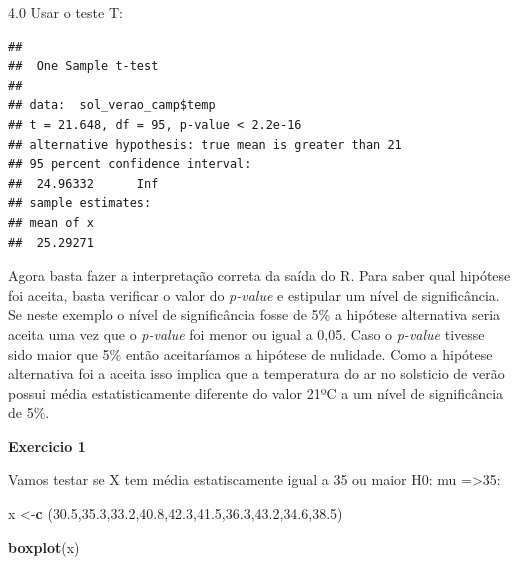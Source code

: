 \documentclass[
]{book}
\newenvironment{Shaded}{\begin{snugshade}}{\end{snugshade}}
\newcommand{\CommentTok}[1]{\textcolor[rgb]{0.56,0.35,0.01}{\textit{#1}}}
\newcommand{\DataTypeTok}[1]{\textcolor[rgb]{0.13,0.29,0.53}{#1}}
\newcommand{\DecValTok}[1]{\textcolor[rgb]{0.00,0.00,0.81}{#1}}
\newcommand{\FloatTok}[1]{\textcolor[rgb]{0.00,0.00,0.81}{#1}}
\newcommand{\KeywordTok}[1]{\textcolor[rgb]{0.13,0.29,0.53}{\textbf{#1}}}
\newcommand{\NormalTok}[1]{#1}
\newcommand{\OperatorTok}[1]{\textcolor[rgb]{0.81,0.36,0.00}{\textbf{#1}}}
\newcommand{\StringTok}[1]{\textcolor[rgb]{0.31,0.60,0.02}{#1}}
\begin{document}
4.0 Usar o teste T:

\begin{Shaded}
\end{Shaded}

\begin{verbatim}
## 
##  One Sample t-test
## 
## data:  sol_verao_camp$temp
## t = 21.648, df = 95, p-value < 2.2e-16
## alternative hypothesis: true mean is greater than 21
## 95 percent confidence interval:
##  24.96332      Inf
## sample estimates:
## mean of x 
##  25.29271
\end{verbatim}

Agora basta fazer a interpretação correta da saída do R.
Para saber qual hipótese foi aceita, basta verificar o valor do \emph{p-value} e estipular um nível de significância. Se neste exemplo o nível de significância fosse de 5\% a hipótese alternativa seria aceita uma vez que o \emph{p-value} foi menor ou igual a 0,05. Caso o \emph{p-value} tivesse sido maior que 5\% então aceitaríamos a hipótese de nulidade.
Como a hipótese alternativa foi a aceita isso implica que a temperatura do ar no solsticio de verão possui média estatisticamente diferente do valor 21ºC a um nível de significância de 5\%.

\textbf{Exercicio 1}

Vamos testar se X tem média estatiscamente igual a 35 ou maior
H0: mu =\textgreater35:

\begin{Shaded}
\begin{Highlighting}[]
\NormalTok{x <-}\KeywordTok{c}\NormalTok{ (}\FloatTok{30.5}\NormalTok{,}\FloatTok{35.3}\NormalTok{,}\FloatTok{33.2}\NormalTok{,}\FloatTok{40.8}\NormalTok{,}\FloatTok{42.3}\NormalTok{,}\FloatTok{41.5}\NormalTok{,}\FloatTok{36.3}\NormalTok{,}\FloatTok{43.2}\NormalTok{,}\FloatTok{34.6}\NormalTok{,}\FloatTok{38.5}\NormalTok{)}

\KeywordTok{boxplot}\NormalTok{(x)}
\end{Highlighting}
\end{Shaded}
\end{document}
